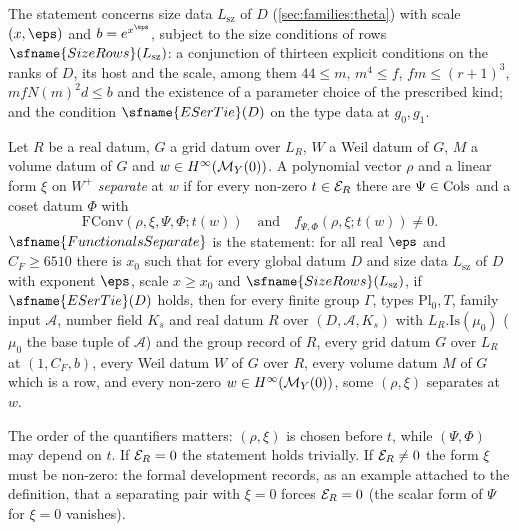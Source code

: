 The statement concerns size data $L_{\mathrm{sz}}$ of $D$ (\cref{sec:families:theta}) with scale $(x,\eps)$ and $b=e^{x^\eps}$,
subject to the size conditions of rows $\sfname{SizeRows}(L_{\mathrm{sz}})$: a conjunction of thirteen explicit conditions on the
ranks of $D$, its host and the scale, among them $44\le m$, $m^4\le f$, $fm\le(r+1)^3$, $mfN(m)^2d\le b$ and the existence of a
parameter choice of the prescribed kind; and the condition $\sfname{ESerTie}(D)$ on the type data at $g_0,g_1$.

\begin{definition}\label{pf:fs:FS}
Let $R$ be a real datum, $G$ a grid datum over $L_R$, $W$ a Weil datum of $G$, $M$ a volume datum of $G$ and
$w\in H^{\infty}(\mathcal M_Y(0))$. A polynomial vector $\rho$ and a linear form $\xi$ on $W^+$ \emph{separate} at $w$ if for every
non-zero $t\in\mathcal E_R$ there are $\Psi\in\mathrm{Cols}$ and a coset datum $\Phi$ with
\[
\mathrm{FConv}(\rho,\xi,\Psi,\Phi;t(w))\quad\text{and}\quad f_{\Psi,\Phi}(\rho,\xi;t(w))\neq0 .
\]
$\sfname{FunctionalsSeparate}$ is the statement: for all real $\eps$ and $C_F\ge6510$ there is $x_0$ such that for every global
datum $D$ and size data $L_{\mathrm{sz}}$ of $D$ with exponent $\eps$, scale $x\ge x_0$ and $\sfname{SizeRows}(L_{\mathrm{sz}})$, if
$\sfname{ESerTie}(D)$ holds, then for every finite group $\Gamma$, types $\mathrm{Pl}_0,T$, family input $\mathcal A$, number field
$K_s$ and real datum $R$ over $(D,\mathcal A,K_s)$ with $L_R.\mathrm{Is}(\mu_0)$ ($\mu_0$ the base tuple of $\mathcal A$) and the group
record of $R$, every grid datum $G$ over $L_R$ at $(1,C_F,b)$, every Weil datum $W$ of $G$ over $R$, every volume datum $M$ of $G$
which is a row, and every non-zero $w\in H^{\infty}(\mathcal M_Y(0))$, some $(\rho,\xi)$ separates at $w$.
\end{definition}

The order of the quantifiers matters: $(\rho,\xi)$ is chosen before $t$, while $(\Psi,\Phi)$ may depend on $t$. If $\mathcal E_R=0$
the statement holds trivially. If $\mathcal E_R\ne0$ the form $\xi$ must be non-zero: the formal development records, as an example
attached to the definition, that a separating pair with $\xi=0$ forces $\mathcal E_R=0$ (the scalar form of $\Psi$ for $\xi=0$
vanishes).

